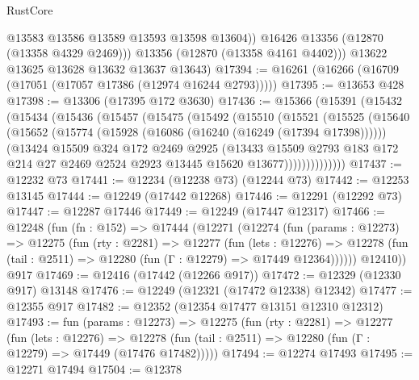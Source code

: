 \begin{lexlean}{RustCore}
\begin{coremodule}
              @13583
              @13586
              @13589
              @13593
              @13598
              @13604))
          @16426
          @13356
          (@12870 (@13358 @4329 @2469)))
        @13356
        (@12870 (@13358 @4161 @4402)))
      @13622
      @13625
      @13628
      @13632
      @13637
      @13643)
@17394 := @16261 (@16266 (@16709 (@17051 (@17057 @17386 (@12974 @16244 @2793)))))
@17395 := @13653 @428
@17398 := @13306 (@17395 @172 @3630)
@17436 := @15366
    (@15391
      (@15432
        (@15434
          (@15436
            (@15457
              (@15475
                (@15492
                  (@15510
                    (@15521
                      (@15525
                        (@15640
                          (@15652
                            (@15774 (@15928 (@16086 (@16240 (@16249 (@17394 @17398))))))
                            (@13424
                              @15509
                              @324
                              @172
                              @2469
                              @2925
                              (@13433
                                @15509
                                @2793
                                @183
                                @172
                                @214
                                @27
                                @2469
                                @2524
                                @2923
                                @13445
                                @15620
                                @13677))))))))))))))
@17437 := @12232 @73
@17441 := @12234 (@12238 @73) (@12244 @73)
@17442 := @12253 @13145
@17444 := @12249 (@17442 @12268)
@17446 := @12291 (@12292 @73)
@17447 := @12287 @17446
@17449 := @12249 (@17447 @12317)
@17466 := @12248
    (fun (fn : @152) =>
    @17444
      (@12271
        (@12274
          (fun (params : @12273) =>
          @12275
            (fun (rty : @2281) =>
            @12277
              (fun (lets : @12276) =>
              @12278 (fun (tail : @2511) => @12280 (fun (Γ : @12279) => @17449 @12364))))))
        @12410))
    @917
@17469 := @12416 (@17442 (@12266 @917))
@17472 := @12329 (@12330 @917) @13148
@17476 := @12249 (@12321 (@17472 @12338) @12342)
@17477 := @12355 @917
@17482 := @12352 (@12354 @17477 @13151 @12310 @12312)
@17493 := fun (params : @12273) =>
  @12275
    (fun (rty : @2281) =>
    @12277
      (fun (lets : @12276) =>
      @12278 (fun (tail : @2511) => @12280 (fun (Γ : @12279) => @17449 (@17476 @17482)))))
@17494 := @12274 @17493
@17495 := @12271 @17494
@17504 := @12378

\end{coremodule}
\end{lexlean}
